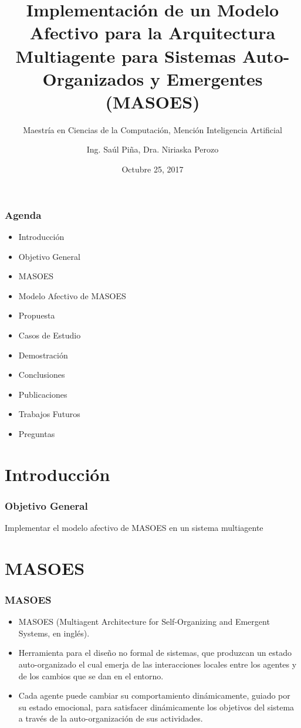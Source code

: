 \documentclass{beamer}
\title{Implementación de un Modelo Afectivo para la Arquitectura Multiagente para Sistemas Auto-Organizados y Emergentes (MASOES)}
\subtitle{Maestría en Ciencias de la Computación, Mención Inteligencia Artificial}
\author{Ing. Saúl Piña, Dra. Niriaska Perozo}
\date{Octubre 25, 2017}
\institute{\url{sauljabin@gmail.com}, \url{nperozo@ucla.edu.ve}}
\begin{document}
\begin{frame}[plain,t]
\titlepage
\end{frame}

\begin{frame}
\frametitle{Agenda}
\begin{itemize}
\item Introducción
\item Objetivo General
\item MASOES
\item Modelo Afectivo de MASOES
\item Propuesta
\item Casos de Estudio
\item Demostración
\item Conclusiones
\item Publicaciones
\item Trabajos Futuros
\item Preguntas
\end{itemize}
\end{frame}

\section{Introducción}

\begin{frame}
\frametitle{Objetivo General}
\huge
Implementar el modelo afectivo de MASOES en un sistema multiagente
\end{frame}

\section{MASOES}

\begin{frame}
\frametitle{MASOES}
\begin{itemize}
	\item MASOES (Multiagent Architecture for Self-Organizing and Emergent Systems, en inglés).
  \item Herramienta para el diseño no
  formal de sistemas, que produzcan un estado auto-organizado el cual emerja de
  las interacciones locales entre los agentes y de los cambios que se dan en el
  entorno.
  \item Cada agente puede cambiar su comportamiento
  dinámicamente, guiado por su estado emocional, para satisfacer dinámicamente los
  objetivos del sistema a través de la auto-organización de sus actividades.
\end{itemize}
\end{frame}
\end{document}
